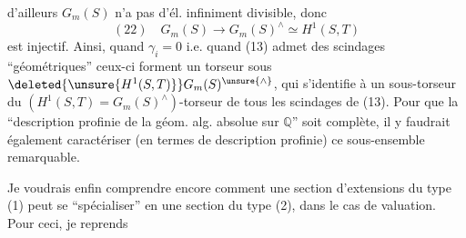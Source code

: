 d'ailleurs $G_m(S)$ n'a pas d'él. infiniment divisible, donc
\[
(22)\quad G_m(S)\longrightarrow G_m(S)^\wedge\simeq H^1(S,T)
\]
est injectif. Ainsi, quand $\gamma_i=0$ i.e. quand (13) admet des scindages ``géométriques''  ceux-ci forment un torseur sous $\deleted{\unsure{H^1(S,T)}}G_m(S)^{\unsure{\wedge}}$, qui s'identifie à un sous-torseur du $(H^1(S,T)=G_m(S)^\wedge)$-torseur de tous les scindages de (13). Pour que la ``description profinie de la géom. alg. absolue sur $\mathbb Q$'' soit complète, il y faudrait également caractériser (en termes de  description profinie) ce sous-ensemble remarquable.

Je voudrais enfin comprendre encore comment une section d'extensions du type (1) peut se ``spécialiser'' en une section du type (2), dans le cas de  valuation. Pour ceci, je reprends
